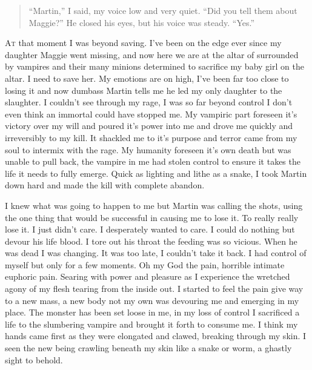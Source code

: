 
\begin{quote}
	``Martin,” I said, my voice low and very quiet. “Did you tell them about Maggie?”
	He closed his eyes, but his voice was steady. “Yes.”
\end{quote}

\begin{comment}
	This is a bigass comment.
\end{comment}

\lettrine[lines=2,lraise=0]{A}t that moment I was beyond saving. I've been on the edge ever since my daughter Maggie went missing, and now here we are at the altar of \chichenitza* surrounded by vampires and their many minions determined to sacrifice my baby girl on the altar. I need to save her. 
My emotions are on high, I've been far too close to losing it and now dumbass Martin tells me he led my only daughter to the slaughter. I couldn't see through my rage, I was so far beyond control I don't even think an immortal could have stopped me. My vampiric part foreseen it's victory over my will and poured it's power into me and drove me quickly and irreversibly to my kill. It shackled me to it's purpose and terror came from my soul to intermix with the rage. My humanity foreseen it's own death but was unable to pull back, the vampire in me had stolen control to ensure it takes the life it needs to fully emerge. Quick as lighting and lithe as a snake, I took Martin down hard and made the kill with complete abandon.

I knew what was going to happen to me but Martin was calling the shots, using the one thing that would be successful in causing me to lose it. To really really lose it. I just didn't care. I desperately wanted to care. I could do nothing but devour his life blood. I tore out his throat the feeding was so vicious. When he was dead I was changing. It was too late, I couldn't take it back. I had control of myself but only for a few moments. Oh my God the pain, horrible intimate euphoric pain. Searing with power and pleasure as I experience the wretched agony of my flesh tearing from the inside out. I started to feel the pain give way to a new mass, a new body not my own was devouring me and emerging in my place. The monster has been set loose in me, in my loss of control I sacrificed a life to the slumbering vampire and brought it forth to consume me. I think my hands came first as they were elongated and clawed, breaking through my skin. I seen the new being crawling beneath my skin like a snake or worm, a ghastly sight to behold.


